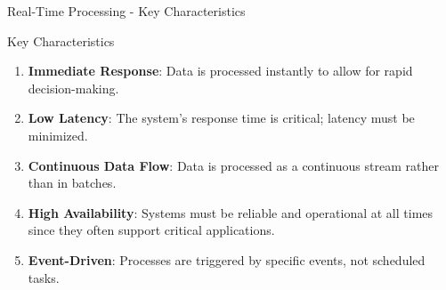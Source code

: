 \documentclass[aspectratio=169]{beamer}
\begin{document}
\begin{frame}[fragile]{Real-Time Processing - Key Characteristics}
    \begin{block}{Key Characteristics}
        \begin{enumerate}
            \item \textbf{Immediate Response}: Data is processed instantly to allow for rapid decision-making.
            \item \textbf{Low Latency}: The system's response time is critical; latency must be minimized.
            \item \textbf{Continuous Data Flow}: Data is processed as a continuous stream rather than in batches.
            \item \textbf{High Availability}: Systems must be reliable and operational at all times since they often support critical applications.
            \item \textbf{Event-Driven}: Processes are triggered by specific events, not scheduled tasks.
        \end{enumerate}
    \end{block}
\end{frame}
\end{document}
